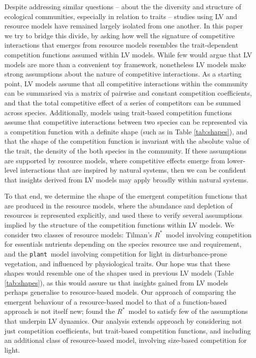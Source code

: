 \documentclass[a4paper,11pt]{article}
\newcommand{\Rstar}{\ensuremath{R^*}}
\newcommand{\plant}{{\tt plant}}
\begin{document}
Despite addressing similar questions -- about the the diversity and structure of ecological communities, especially in relation to traits -- studies using LV and resource models have remained largely isolated from one another. In this paper we try to bridge this divide, by asking how well the signature of competitive interactions that emerges from resource models resembles the trait-dependent competition functions assumed within LV models. While few would argue that LV models are more than a convenient toy framework, nonetheless LV models make strong assumptions about the nature of competitive interactions. As a starting point, LV models assume that all competitive interactions within the community can be summarised via a matrix of pairwise and constant competition coefficients, and that the total competitive effect of a series of competitors can be summed across species. Additionally, models using trait-based competition functions assume that competitive interactions between two species can be represented via a competition function with a definite shape (such as in Table \ref{tab:shapes}), and that the shape of the competition function is invariant with the absolute value of the trait, the density of the both species in the community. If these assumptions are supported by resource models, where competitive effects emerge from lower-level interactions that are inspired by natural systems, then we can be confident that insights derived from LV models may apply broadly within natural systems. 

To that end, we determine the shape of the emergent competition functions that are produced in the resource models, where the abundance and depletion of resources is represented explicitly, and used these to verify several assumptions implied by the structure of the competition functions within LV models. We consider two classes of resource models: Tilman's \Rstar\ model involving competition for essentials nutrients depending on the species resource use and requirement, and the \plant\ model involving competition for light in disturbance-prone vegetation, and influenced by physiological traits. Our hope was that these shapes would resemble one of the shapes used in previous LV models (Table \ref{tab:shapes}), as this would assure us that insights gained from LV models perhaps generalise to resource-based models. Our approach of comparing the emergent behaviour of a resource-based model to that of a function-based approach is not itself new; \citet{Abrams-2008} found the \Rstar\ model to satisfy few of the assumptions that underpin LV dynamics. Our analysis extends \citeauthor{Abrams-2008} approach by considering not just competition coefficients, but trait-based competition functions, and including an additional class of resource-based model, involving size-based competition for light.
\end{document}
